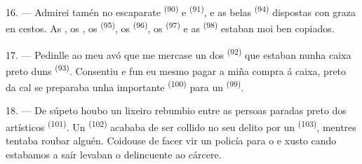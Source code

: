 16. --- Admirei tamén no escaparate  \textsuperscript{(90)} e
 \textsuperscript{(91)}, e as belas  \textsuperscript{(94)} dispostas con graza en cestos. As
, os , os 
\textsuperscript{(95)}, os  \textsuperscript{(96)}, os
 \textsuperscript{(97)} e as 
\textsuperscript{(98)} estaban moi ben copiados.

\VUsaut{4.4mm}
\VUsaut{2.8mm}

17. --- Pedinlle ao meu avó que me mercase un dos 
\textsuperscript{(92)} que estaban nunha caixa preto duns 
\textsuperscript{(93)}. Consentiu e fun eu mesmo pagar a miña compra á caixa, preto da
cal se preparaba unha importante  \textsuperscript{(100)} para un
 \textsuperscript{(99)}.

18. --- De súpeto houbo un lixeiro rebumbio entre as persoas paradas preto dos
 artísticos \textsuperscript{(101)}. Un 
\textsuperscript{(102)} acababa de ser collido no seu delito por un 
\textsuperscript{(103)}, mentres tentaba roubar alguén. Coidouse de facer vir un
policía para o  e xusto cando estabamos a saír levaban o delincuente ao cárcere.
